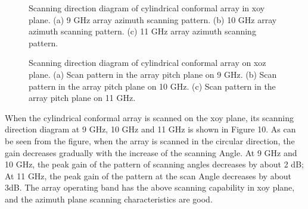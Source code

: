 \documentclass[USenglish]{article}
\theoremstyle{dgthm}
\theoremstyle{dgdef}
\begin{document}
\begin{figure}[htbp]
	\centering
	\caption{Scanning direction diagram of cylindrical conformal array in xoy plane. (a) 9 GHz array azimuth scanning pattern. (b) 10 GHz array azimuth scanning pattern. (c) 11 GHz array azimuth scanning pattern.}
\end{figure}
\begin{figure}[htbp]
	\centering
	\caption{Scanning direction diagram of cylindrical conformal array on xoz plane. (a) Scan pattern in the array pitch plane on 9 GHz. (b) Scan pattern in the array pitch plane on 10 GHz. (c) Scan pattern in the array pitch plane on 11 GHz.}
\end{figure}


When the cylindrical conformal array is scanned on the xoy plane, its scanning direction diagram at 9 GHz, 10 GHz and 11 GHz is shown in Figure 10. As can be seen from the figure, when the array is scanned in the circular direction, the gain decreases gradually with the increase of the scanning Angle. At 9 GHz and 10 GHz, the peak gain of the pattern of scanning angles decreases by about 2 dB; At 11 GHz, the peak gain of the pattern at the scan Angle decreases by about 3dB. The array operating band has the above scanning capability in xoy plane, and the azimuth plane scanning characteristics are good.
\end{document}
